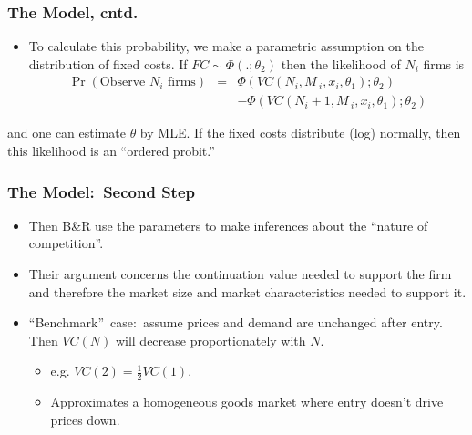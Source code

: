 \begin{frame}%

\frametitle{The Model, cntd.}

\begin{itemize}
\item To calculate this probability, we make a parametric assumption on the
distribution of fixed costs. If $FC\sim \Phi (.;\theta _{2})$ then the
likelihood of $N_{i}$ firms is 
\begin{eqnarray}
\Pr (\text{Observe }N_{i}\text{ firms}) &=&\Phi
(VC(N_{i},M\,_{i},x_{i},\theta _{1});\theta _{2})  \label{entry4} \\
&&-\Phi (VC(N_{i}+1,M\,_{i},x_{i},\theta _{1});\theta _{2})
\end{eqnarray}
\end{itemize}

and one can estimate $\theta $ by MLE. If the fixed costs distribute (log)
normally, then this likelihood is an \textquotedblleft ordered
probit.\textquotedblright\ 

\end{frame}%

\begin{frame}%

\frametitle{The Model:\ Second Step}

\begin{itemize}
\item Then B\&R use the parameters to make inferences about the
\textquotedblleft nature of competition\textquotedblright .

\item Their argument concerns the continuation value needed to support the
firm and therefore the market size and market characteristics needed to
support it.

\item \textquotedblleft Benchmark\textquotedblright\ case:\ assume prices
and demand are unchanged after entry. Then $VC(N)$ will decrease
proportionately with $N$.

\begin{itemize}
\item e.g. $VC(2)=\frac{1}{2}VC(1)$.

\item Approximates a homogeneous goods market where entry doesn't drive
prices down.
\end{itemize}
\end{itemize}

\end{frame}%

